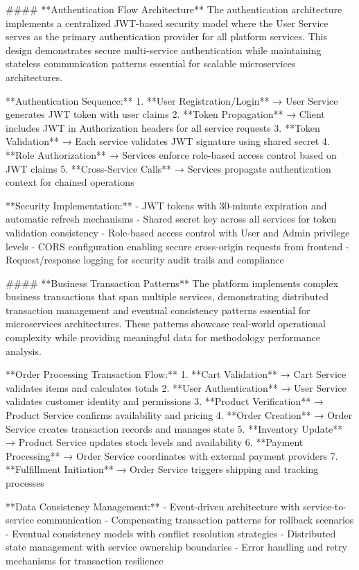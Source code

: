 #### **Authentication Flow Architecture**
The authentication architecture implements a centralized JWT-based security model where the User Service serves as the primary authentication provider for all platform services. This design demonstrates secure multi-service authentication while maintaining stateless communication patterns essential for scalable microservices architectures.

**Authentication Sequence:**
1. **User Registration/Login** → User Service generates JWT token with user claims
2. **Token Propagation** → Client includes JWT in Authorization headers for all service requests
3. **Token Validation** → Each service validates JWT signature using shared secret
4. **Role Authorization** → Services enforce role-based access control based on JWT claims
5. **Cross-Service Calls** → Services propagate authentication context for chained operations

**Security Implementation:**
- JWT tokens with 30-minute expiration and automatic refresh mechanisms
- Shared secret key across all services for token validation consistency
- Role-based access control with User and Admin privilege levels
- CORS configuration enabling secure cross-origin requests from frontend
- Request/response logging for security audit trails and compliance

#### **Business Transaction Patterns**
The platform implements complex business transactions that span multiple services, demonstrating distributed transaction management and eventual consistency patterns essential for microservices architectures. These patterns showcase real-world operational complexity while providing meaningful data for methodology performance analysis.

**Order Processing Transaction Flow:**
1. **Cart Validation** → Cart Service validates items and calculates totals
2. **User Authentication** → User Service validates customer identity and permissions
3. **Product Verification** → Product Service confirms availability and pricing
4. **Order Creation** → Order Service creates transaction records and manages state
5. **Inventory Update** → Product Service updates stock levels and availability
6. **Payment Processing** → Order Service coordinates with external payment providers
7. **Fulfillment Initiation** → Order Service triggers shipping and tracking processes

**Data Consistency Management:**
- Event-driven architecture with service-to-service communication
- Compensating transaction patterns for rollback scenarios
- Eventual consistency models with conflict resolution strategies
- Distributed state management with service ownership boundaries
- Error handling and retry mechanisms for transaction resilience

